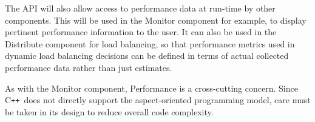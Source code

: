 \documentclass[11pt,letterpaper]{article}
\newcommand{\pp}{\texttt{++}}
\newcommand{\cpp}{C\pp}
\newcommand{\code}[1]{\textsf{#1}}
\begin{document}
The API will also allow access to performance data at run-time by
other components.  This will be used in the \code{Monitor} component
for example, to display pertinent performance information to the user.
It can also be used in the \code{Distribute} component for load
balancing, so that performance metrics used in dynamic load balancing
decisions can be defined in terms of actual collected performance data
rather than just estimates.

As with the \code{Monitor} component, \code{Performance} is a
cross-cutting concern.  Since \cpp\ does not directly support the
aspect-oriented programming model, care must be taken in its design to
reduce overall code complexity.

% 
% 
% 
% 



\end{document}
